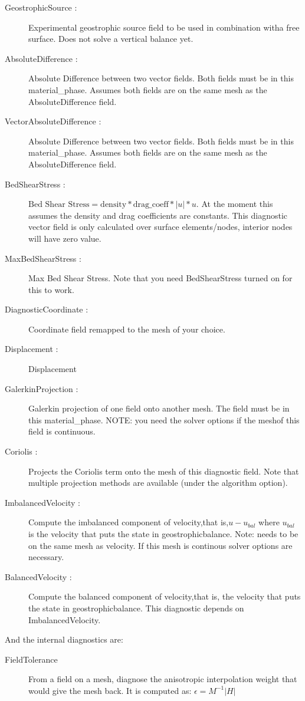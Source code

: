 \begin{description}
 \item[GeostrophicSource :] Experimental geostrophic source field to be used in combination witha free surface. Does not solve a vertical balance yet.    
 \item[AbsoluteDifference :] Absolute Difference between two vector fields. Both fields must be in this material\_phase. Assumes both fields are on the same mesh as the AbsoluteDifference field.    
 \item[VectorAbsoluteDifference :] Absolute Difference between two vector fields. Both fields must be in this material\_phase. Assumes both fields are on the same mesh as the AbsoluteDifference field.    
 \item[BedShearStress :] $\mbox{Bed Shear Stress} = \mbox{density}*\mbox{drag\_coeff}*|u|*u$. At the moment this assumes the density and drag coefficients are constants. This diagnostic vector field is only calculated over surface elements/nodes, interior nodes will have zero value.    
 \item[MaxBedShearStress :] Max Bed Shear Stress. Note that you need BedShearStress turned on for this to work.    
 \item[DiagnosticCoordinate :] Coordinate field remapped to the mesh of your choice.    
 \item[Displacement :] Displacement    
 \item[GalerkinProjection :] Galerkin projection of one field onto another mesh. The field must be in this material\_phase. NOTE: you need the solver options if the meshof this field is continuous.    
 \item[Coriolis :] Projects the Coriolis term onto the mesh of this diagnostic field. Note that multiple projection methods are available (under the algorithm option).    
 \item[ImbalancedVelocity :] Compute the imbalanced component of velocity,that is,$u - u_{bal}$ where $u_{bal}$ is the velocity that puts the state in geostrophicbalance. Note: needs to be on the same mesh as velocity. If this mesh is continous solver options are necessary.
 \item[BalancedVelocity :] Compute the balanced component of velocity,that is, the velocity that puts the state in geostrophicbalance. This diagnostic depends on ImbalancedVelocity.    
\end{description}


And the internal   diagnostics are:

\begin{description}
\item[FieldTolerance] From a field on a mesh, diagnose the anisotropic interpolation weight that would give the mesh back. It is computed as: $\epsilon = M^{-1} |H|$ 
\end{description}


